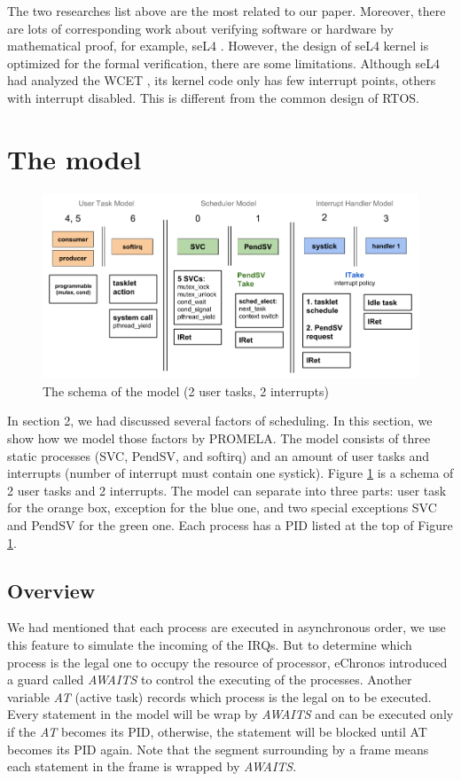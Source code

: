 The two researches list above are the most related to our paper. Moreover, there are lots of corresponding work about verifying software or hardware by mathematical proof, for example, seL4 \cite{Klein:2009:SFV:1629575.1629596}. However, the design of seL4 kernel is optimized for the formal verification, there are some limitations. Although seL4 had analyzed the WCET \cite{6121451}, its kernel code only has few interrupt points, others with interrupt disabled. This is different from the common design of RTOS.

\section{The model}

\begin{figure}
\includegraphics[width=0.7\linewidth]{img/model}
\caption{The schema of the model (2 user tasks, 2 interrupts)}
\label{fig:model}
\end{figure}

In section 2, we had discussed several factors of scheduling. In this section, we show how we model those factors by PROMELA. The model consists of three static processes (SVC, PendSV, and softirq) and an amount of user tasks and interrupts (number of interrupt must contain one systick). Figure \ref{fig:model} is a schema of 2 user tasks and 2 interrupts. The model can separate into three parts: user task for the orange box, exception for the blue one, and two special exceptions SVC and PendSV for the green one. Each process has a PID listed at the top of Figure \ref{fig:model}.

\subsection{Overview}
We had mentioned that each process are executed in asynchronous order, we use this feature to simulate the incoming of the IRQs. But to determine which process is the legal one to occupy the resource of processor, eChronos introduced a guard called \textit{AWAITS} to control the executing of the processes. Another variable \textit{AT} (active task) records which process is the legal on to be executed. Every statement in the model will be wrap by \textit{AWAITS} and can be executed only if the \textit{AT} becomes its PID, otherwise, the statement will be blocked until AT becomes its PID again. Note that the segment surrounding by a frame means each statement in the frame is wrapped by \textit{AWAITS}.


